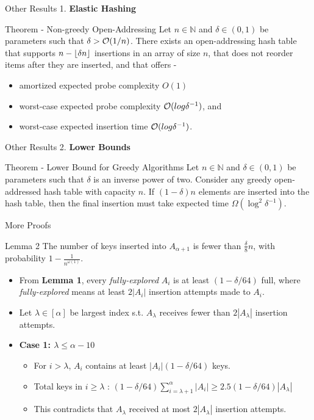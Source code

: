 \documentclass{beamer}
\begin{document}
\begin{frame} {Other Results}
	1. {\bf Elastic Hashing}
	\begin{block}{Theorem - Non-greedy Open-Addressing}
		Let $n \in \mathbb{N}$ and $\delta \in(0, 1)$ be parameters such that $\delta > 
		{\cal O}(1/n)$. There exists an open-addressing hash table that supports $n - \left\lfloor \delta n \right\rfloor$ insertions in an array of size $n$, that does not reorder items after they are inserted, and that oﬀers -
		\begin{itemize}
			\item amortized expected probe complexity $O(1)$
			\item worst-case expected probe complexity ${\cal O}(log \delta^{-1})$, and
			\item worst-case expected
			insertion time ${\cal O}(log \delta^{-1})$.
		\end{itemize}
	\end{block}
\end{frame}


\begin{frame}{Other Results}
	2. {\bf Lower Bounds}
	\begin{block}{Theorem - Lower Bound for Greedy Algorithms}
			Let $n \in \mathbb{N}$ and $\delta \in(0, 1)$ be parameters such that $\delta$ is an inverse power of two. Consider any greedy open-addressed hash table with capacity $n$. If $(1-\delta)n$ elements are inserted into the hash table, then the final insertion must take expected time $\Omega(\log^2{\delta^{-1}})$.
	\end{block}
\end{frame}

\begin{frame}{More Proofs}
	\begin{block}{Lemma 2}
		The number of keys inserted into $A_{\alpha + 1}$ is fewer than $\frac{\delta}{8}n$, with probability $1 - \frac{1}{n^{\omega(1)}}$.
	\end{block}
\begin{itemize}
	\item From {\bf Lemma 1}, every {\em fully-explored} $A_i$ is at least $(1-\delta / 64)$ full, where {\em fully-explored} means at least $2|A_i|$ insertion attempts made to $A_i$.
	\item Let $\lambda \in [\alpha]$ be largest index s.t. $A_{\lambda}$ receives fewer than $2|A_{\lambda}|$ insertion attempts. 
	\item {\bf Case 1: $\lambda \le \alpha - 10$} 
	\begin{itemize}
		\item For $i>\lambda$, $A_i$ contains at least $|A_i|(1-\delta/64)$ keys. 
		\item Total keys in $i \ge \lambda$ : $(1-\delta/64) \sum_{i=\lambda+1}^{\alpha}|A_i| \ge 2.5(1-\delta/64)|A_{\lambda}|$
		\item This contradicts that $A_{\lambda}$ received at most $2|A_{\lambda}|$ insertion attempts.
	\end{itemize}  
\end{itemize}
\end{frame}
\end{document}
